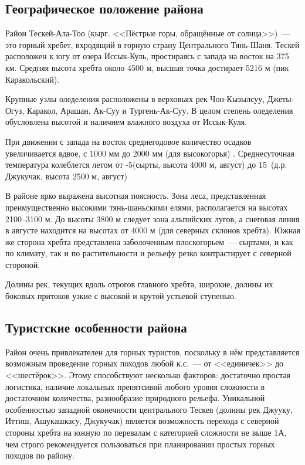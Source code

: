 \clearpage

\subsection{Географическое положение района}

Район Тескей-Ала-Тоо (кырг. <<Пёстрые горы, обращённые от солнца>>)~--- это горный хребет, вхродящий в горную страну Центрального Тянь-Шаня. Тескей расположен к югу от озера Иссык-Куль, простираясь с запада на восток на 375 км. Средняя высота хребта около 4500 м, высшая точка достирает 5216 м (пик Каракольский).

Крупные узлы оледеления расположены в верховьях рек Чон-Кызылсуу, Джеты-Огуз, Каракол, Арашан, Ак-Суу и Тургень-Ак-Суу. В целом степень оледеления обусловлена высотой и наличием влажного воздуха от Иссык-Куля.

При движении с запада на восток среднегодовое количество осадков увеличивается вдвое, с 1000 мм до 2000 мм (для высокогорья) \cite{rodina2012}. Среднесуточная температура колеблется летом от -5\degree (сырты, высота 4000 м, август) до 15\degree~(д.р. Джукучак, высота 2500 м, август)

В районе ярко выражена высотная поясность. Зона леса, представленная преимущественно высокими тянь-шаньскими елями, располагается на высотах 2100--3100 м. До высоты 3800 м следует зона альпийских лугов, а снеговая линия в августе находится на высотах от 4000 м (для северных склонов хребта). Южная же сторона хребта представлена заболоченным плоскогорьем~--- сыртами, и как по климату, так и по растительности и рельефу резко контрастирует с северной стороной.

Долины рек, текущих вдоль отрогов главного хребта, широкие, долины их боковых притоков узкие с высокой и крутой устьевой ступенью.

\subsection{Туристские особенности района}
Район очень привлекателен для горных туристов, поскольку в нём представляется возможным проведение горных походов любой к.с.~--- от <<единичек>> до <<шестёрок>>. Этому способствуют несколько факторов: достаточно простая логистика, наличие локальных препятсивий любого уровня сложности в достаточном количества, разнообразие природного рельефа. Уникальной особенностью западной оконечности центрального Тескея (долины рек Джууку, Иттиш, Ашукашкасу, Джукучак) является возможность перехода с северной стороны хребта на южную по перевалам с категорией сложности не выше 1А, чем строго рекомендуется пользоваться при планировании простых горных походов по району.

